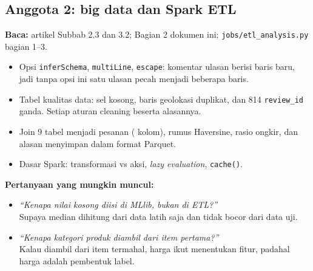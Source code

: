 \documentclass[11pt,a4paper]{article}
\newcommand{\f}[1]{\texttt{#1}}
\newcommand{\tanya}[2]{\item \textit{``#1''}\\ #2}
\begin{document}
\subsection{Anggota 2: big data dan Spark ETL}
\textbf{Baca:} artikel Subbab 2.3 dan 3.2; Bagian 2 dokumen ini; \f{jobs/etl\_analysis.py} bagian 1--3.
\begin{itemize}
\item Opsi \f{inferSchema}, \f{multiLine}, \f{escape}: komentar ulasan berisi baris
  baru, jadi tanpa opsi ini satu ulasan pecah menjadi beberapa baris.
\item Tabel kualitas data: sel kosong, \cleanGeoDup{} baris geolokasi duplikat, dan 814
  \f{review\_id} ganda. Setiap aturan cleaning beserta alasannya.
\item Join 9 tabel menjadi \nOrders{} pesanan (\curatedColumns{} kolom), rumus Haversine,
  rasio ongkir, dan alasan menyimpan dalam format Parquet.
\item Dasar Spark: transformasi vs aksi, \emph{lazy evaluation}, \f{cache()}.
\end{itemize}
\textbf{Pertanyaan yang mungkin muncul:}
\begin{itemize}
\tanya{Kenapa nilai kosong diisi di MLlib, bukan di ETL?}{Supaya median dihitung dari data
  latih saja dan tidak bocor dari data uji.}
\tanya{Kenapa kategori produk diambil dari item pertama?}{Kalau diambil dari item termahal,
  harga ikut menentukan fitur, padahal harga adalah pembentuk label.}
\end{itemize}
\end{document}
